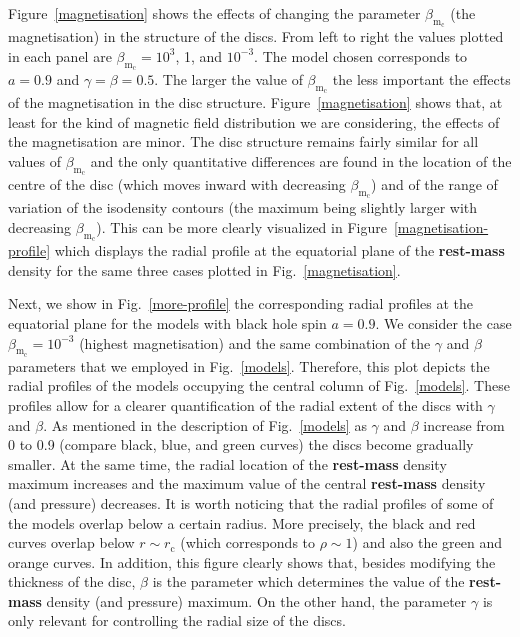 \documentclass[]{aa}
\begin{document}
Figure~\ref{magnetisation} shows the effects of changing the parameter $\beta_{\mathrm{m}_{\mathrm{c}}}$ (the magnetisation) in the structure of the discs. From left to right the values plotted in each panel are $\beta_{\mathrm{m}_{\mathrm{c}}}=10^3$, 1, and $10^{-3}$. The model chosen corresponds to $a=0.9$ and $\gamma=\beta=0.5$. The larger the value of $\beta_{\mathrm{m}_{\mathrm{c}}}$ the less important the effects of the magnetisation in the disc structure. Figure~\ref{magnetisation} shows that, at least for the kind of magnetic field distribution we are considering, the effects of the magnetisation are minor. The disc structure remains fairly similar for all values of $\beta_{\mathrm{m}_{\mathrm{c}}}
$ and the only quantitative differences are found in the location of the centre of the disc (which moves inward with decreasing $\beta_{\mathrm{m}_{\mathrm{c}}}$) and of the range of variation of the isodensity contours (the maximum being slightly larger with decreasing $\beta_{\mathrm{m}_{\mathrm{c}}}$). This can be more clearly visualized in Figure~\ref{magnetisation-profile} which displays the radial profile at the equatorial plane of the {\bf rest-mass} density for the same three cases plotted in Fig.~\ref{magnetisation}.

Next, we show in Fig.~\ref{more-profile} the corresponding radial profiles at the equatorial plane for the models with black hole spin $a=0.9$. We consider the case $\beta_{\mathrm{m}_{\mathrm{c}}}=10^{-3}$ (highest magnetisation) and the same combination of the $\gamma$ and $\beta$ parameters that we employed in Fig.~\ref{models}. Therefore, this plot depicts the radial profiles of the models occupying the central column of Fig.~\ref{models}. These profiles allow for a clearer quantification of the radial extent of the discs with $\gamma$ and $\beta$. As mentioned in the description of Fig.~\ref{models} as $\gamma$ and $\beta$ increase from 0 to 0.9 (compare black, blue, and green curves) the discs become gradually smaller. At the same time, the radial location of the {\bf rest-mass} density maximum increases and the maximum value of the central {\bf rest-mass} density (and pressure) decreases. It is worth noticing that the radial profiles of some of the models overlap below a certain radius. More precisely, the black and red curves overlap below $r\sim r_{\mathrm{c}}$ (which corresponds to $\rho \sim 1$) and also the green and orange curves. In addition, this figure clearly shows that, besides modifying the thickness of the disc, $\beta$ is the parameter which determines the value of the {\bf rest-mass} density (and pressure) maximum. On the other hand, the parameter $\gamma$ is only relevant for controlling the radial size of the discs.
\end{document}
